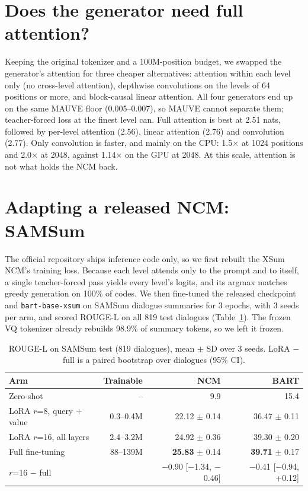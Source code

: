 \documentclass[11pt]{article}
\begin{document}
\section{Does the generator need full attention?}\label{sec:mixers}
Keeping the original tokenizer and a 100M-position budget, we swapped the generator's
attention for three cheaper alternatives: attention within each level only (no cross-level
attention), depthwise convolutions on the levels of 64 positions or more, and block-causal
linear attention. All four generators end up on the same MAUVE floor (0.005--0.007), so MAUVE
cannot separate them; teacher-forced loss at the finest level can. Full attention is best at
2.51 nats, followed by per-level attention (2.56), linear attention (2.76) and convolution
(2.77). Only convolution is faster, and mainly on the CPU: 1.5$\times$ at 1024 positions and
2.0$\times$ at 2048, against 1.14$\times$ on the GPU at 2048. At this scale, attention is not
what holds the NCM back.

\section{Adapting a released NCM: SAMSum}\label{sec:finetune}
The official repository ships inference code only, so we first rebuilt the XSum NCM's
training loss. Because each level attends only to the prompt and to itself, a single
teacher-forced pass yields every level's logits, and its argmax matches greedy generation on
100\% of codes. We then fine-tuned the released checkpoint and \texttt{bart-base-xsum} on SAMSum
dialogue summaries for 3 epochs, with 3 seeds per arm, and scored ROUGE-L on all 819 test
dialogues (Table~\ref{tab:samsum}). The frozen VQ tokenizer already rebuilds 98.9\% of summary
tokens, so we left it frozen.

\begin{table}[t]\centering\small
\caption{ROUGE-L on SAMSum test (819 dialogues), mean $\pm$ SD over 3 seeds. LoRA $-$ full is
a paired bootstrap over dialogues (95\% CI).}\label{tab:samsum}
\begin{tabular}{lrrr}\toprule
Arm & Trainable & NCM & BART\\\midrule
Zero-shot & -- & 9.9 & 15.4\\
LoRA $r$=8, query + value & 0.3--0.4M & 22.12 $\pm$ 0.14 & 36.47 $\pm$ 0.11\\
LoRA $r$=16, all layers & 2.4--3.2M & 24.92 $\pm$ 0.36 & 39.30 $\pm$ 0.20\\
Full fine-tuning & 88--139M & \textbf{25.83} $\pm$ 0.14 & \textbf{39.71} $\pm$ 0.17\\\midrule
$r$=16 $-$ full & & $-$0.90 [$-$1.34, $-$0.46] & $-$0.41 [$-$0.94, +0.12]\\\bottomrule
\end{tabular}
\end{table}
\end{document}
